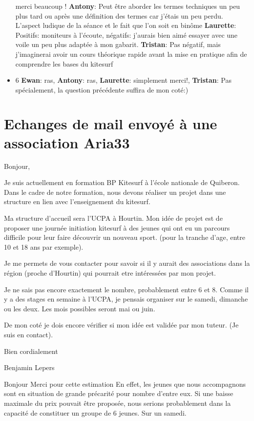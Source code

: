 \documentclass[12pt,a4paper]{report}
\begin{document}
\begin{itemize}
 merci beaucoup !
\textbf{Antony}: Peut \^etre aborder les termes techniques un peu plus tard ou après 
une définition des termes car j'étais un peu perdu. 
L'aspect ludique de la séance et le fait que l'on soit en bin\^ome
\textbf{Laurette}: Positifs: moniteurs à l'écoute, négatifs: j'aurais bien aimé essayer
avec une voile un peu plus adaptée à mon gabarit.
\textbf{Tristan}: Pas négatif, mais j'imaginerai avoir un cours théorique rapide avant
la mise en pratique afin de comprendre les bases du kitesurf
\item 6 \textbf{Ewan}: ras, \textbf{Antony}: ras, 
\textbf{Laurette}: simplement merci!, \textbf{Tristan}: Pas spécialement, la question
précédente suffira de mon coté:)
\end{itemize}


\chapter{Echanges de mail envoyé à une association Aria33}\label{appendix_mail}
Bonjour,

Je suis actuellement en formation BP Kitesurf à l'école nationale de Quiberon.
Dans le cadre de notre formation, nous devons réaliser un projet dans
une structure en lien avec l'enseignement du kitesurf.

Ma structure d'accueil sera l'UCPA à Hourtin.
Mon idée de projet est de proposer une journée initiation kitesurf à
des jeunes qui ont eu un parcours difficile pour leur faire découvrir
un nouveau sport.
 (pour la tranche d'age, entre 10 et 18 ans par exemple).

Je me permets de vous contacter pour savoir si il y aurait des
associations dans la région (proche d'Hourtin) qui pourrait etre
intéressées par mon projet.

Je ne sais pas encore exactement le nombre, probablement entre 6 et 8.
Comme il y a des stages en semaine à l'UCPA, je pensais organiser sur
le samedi, dimanche ou les deux. Les mois possibles seront mai ou
juin.

De mon coté je dois encore vérifier si mon idée est validée par mon
tuteur. (Je suis en contact).


Bien cordialement

Benjamin Lepers

\bigskip
Bonjour
Merci pour cette estimation
En effet, les jeunes que nous accompagnons sont en situation de grande
précarité pour nombre d'entre eux. Si une baisse maximale du prix
pouvait être proposée, nous serions probablement dans la capacité
de constituer un groupe de 6 jeunes. Sur un samedi.
\end{document}
